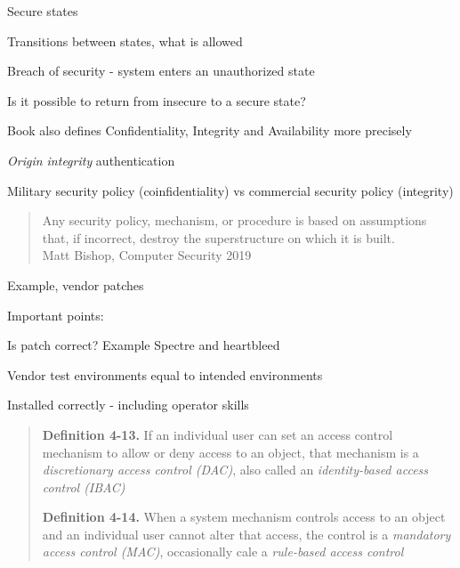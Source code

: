 \documentclass[Screen16to9,17pt]{foils}
\begin{document}
\begin{list1}
\item Secure states
\item Transitions between states, what is allowed
\item Breach of security - system enters an unauthorized state
\item Is it possible to return from insecure to a secure state?
\item Book also defines Confidentiality, Integrity and Availability more precisely
\item \emph{Origin integrity} authentication
\item Military security policy (coinfidentiality) vs commercial security policy (integrity)
\end{list1}


\begin{quote}
Any security policy, mechanism, or procedure is based on assumptions that, if incorrect, destroy the superstructure on which it is built.\\
Matt Bishop, Computer Security 2019
\end{quote}

\begin{list1}
\item Example, vendor patches
\item Important points:
\begin{list2}
\item Is patch correct? Example Spectre and heartbleed
\item Vendor test environments equal to intended environments
\item Installed correctly - including operator skills
\end{list2}
\end{list1}


\begin{quote}
{\bf Definition 4-13.} If an individual user can set an access control mechanism to allow or deny access to an object, that mechanism is a \emph{discretionary access control (DAC)}, also called an \emph{identity-based access control (IBAC)}

{\bf Definition 4-14.}  When a system mechanism controls access to an object and an individual user cannot alter that access, the control is a \emph{mandatory access control (MAC)}, occasionally cale a \emph{rule-based access control}
\end{quote}
\end{document}
